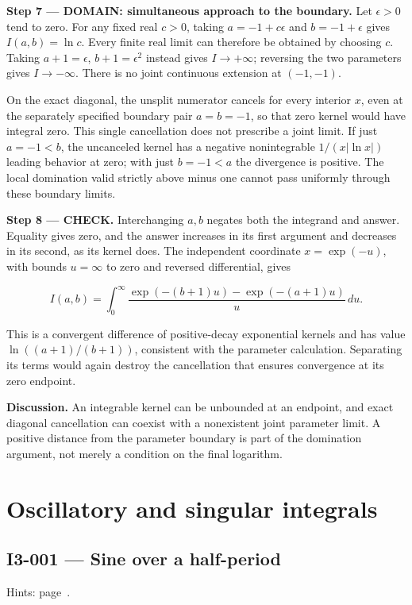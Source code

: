 \documentclass[11pt,oneside,openany]{book}
\begin{document}
\begin{DomainStep}
\textbf{Step 7 --- DOMAIN: simultaneous approach to the boundary.} Let \(\epsilon>0\) tend to zero. For any fixed real \(c>0\), taking \(a=-1+c\epsilon\) and \(b=-1+\epsilon\) gives \(I(a,b)=\ln c\). Every finite real limit can therefore be obtained by choosing \(c\). Taking \(a+1=\epsilon\), \(b+1=\epsilon^2\) instead gives \(I\to+\infty\); reversing the two parameters gives \(I\to-\infty\). There is no joint continuous extension at \((-1,-1)\).

On the exact diagonal, the unsplit numerator cancels for every interior \(x\), even at the separately specified boundary pair \(a=b=-1\), so that zero kernel would have integral zero. This single cancellation does not prescribe a joint limit. If just \(a=-1<b\), the uncanceled kernel has a negative nonintegrable \(1/(x|\ln x|)\) leading behavior at zero; with just \(b=-1<a\) the divergence is positive. The local domination valid strictly above minus one cannot pass uniformly through these boundary limits.

\end{DomainStep}
\textbf{Step 8 --- CHECK.} Interchanging \(a,b\) negates both the integrand and answer. Equality gives zero, and the answer increases in its first argument and decreases in its second, as its kernel does. The independent coordinate \(x=\exp(-u)\), with bounds \(u=\infty\) to zero and reversed differential, gives

\[
I(a,b)=\int_0^\infty
\frac{\exp(-(b+1)u)-\exp(-(a+1)u)}{u}\,du.
\]

This is a convergent difference of positive-decay exponential kernels and has value \(\ln((a+1)/(b+1))\), consistent with the parameter calculation. Separating its terms would again destroy the cancellation that ensures convergence at its zero endpoint.

\textbf{Discussion.} An integrable kernel can be unbounded at an endpoint, and exact diagonal cancellation can coexist with a nonexistent joint parameter limit. A positive distance from the parameter boundary is part of the domination argument, not merely a condition on the final logarithm.

\chapter{Oscillatory and singular integrals}
\markright{}
\section{I3-001 --- Sine over a half-period}
\label{problem:I3-001}
{\small Hints: page~\pageref{hints:I3-001}.}\par\medskip
\end{document}
